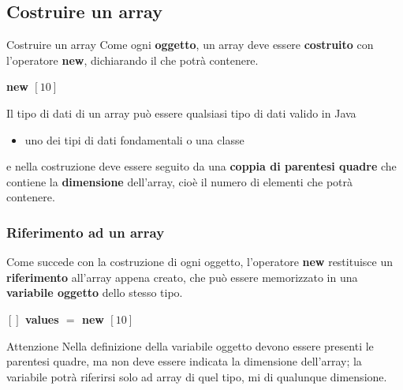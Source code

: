 \subsection*{Costruire un array}
\begin{frame}
\begin{block}{Costruire un array}
Come ogni \textbf{oggetto}, un array deve essere \textbf{costruito} con l'operatore \textbf{\alert{new}}, dichiarando il 
\textbf{} che potrà contenere. 
\end{block}
\hspace*{1 cm}\textbf{\alert{new}  $\left[10\right]$}\\
\begin{block}{}
Il tipo di dati di un array può essere qualsiasi tipo di dati valido in Java
\begin{itemize}
\item uno dei tipi di dati fondamentali o una classe
\end{itemize}
e nella costruzione deve essere seguito da una \textbf{coppia di parentesi quadre} che contiene la \textbf{dimensione} dell'array,
cioè il numero di elementi che potrà contenere.
\end{block}
\end{frame}

\begin{frame}
\frametitle{Riferimento ad un array}
\begin{block}{}
Come succede con la costruzione di ogni oggetto, l'operatore \textbf{new} restituisce un \textbf{riferimento} all'array appena 
creato, che può essere memorizzato in una \textbf{\alert{variabile oggetto}} dello stesso tipo.
\end{block}
\hspace{1.0cm} \textbf{$\left[\right]$ \alert{values} $=$ new $\left[10\right]$}
\begin{block}{Attenzione}
Nella definizione della variabile oggetto devono essere presenti le parentesi quadre, ma non deve essere indicata la dimensione 
dell'array; la variabile potrà riferirsi solo ad array di quel tipo, mi di qualunque dimensione.
\end{block}
\end{frame}

